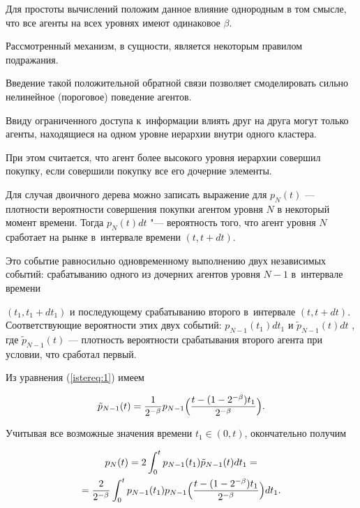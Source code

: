Для простоты вычислений положим данное влияние однородным в том смысле, что все агенты на всех уровнях имеют одинаковое $\beta$.



Рассмотренный механизм, в сущности, является некоторым правилом подражания.

Введение такой положительной обратной связи позволяет смоделировать сильно нелинейное (пороговое) поведение агентов.

Ввиду ограниченного доступа к~информации влиять друг на друга могут только агенты, находящиеся на одном уровне иерархии внутри одного кластера.

При этом считается, что агент более высокого уровня иерархии совершил покупку, если совершили покупку все его дочерние элементы.



Для случая двоичного дерева можно записать выражение для $p_{N} (t)$ --- плотности вероятности совершения покупки агентом уровня $N$ в некоторый момент времени. Тогда $p_{N} (t)dt$ "--- вероятность того, что агент уровня $N$ сработает на рынке в~интервале времени $(t, t+dt)$.

Это событие равносильно одновременному выполнению двух независимых событий: срабатыванию одного из дочерних агентов  уровня $N-1$ в~интервале времени

\mbox{$(t_1, t_1  + dt_1  )$} и последующему срабатыванию второго в~интервале $(t, t+dt)$. Соответствующие вероятности этих двух событий: $p_{N-1} (t_1)dt_1$ и $\tilde{p}_{N-1} (t)dt$ , где $\tilde{p}_{N-1} (t)$ --- плотность вероятности срабатывания второго агента при условии, что сработал первый.

Из уравнения (\ref{istereq:1}) имеем

$$

\tilde{p}_{N-1} (t)=\frac{1}{2^{-\beta } } p_{N-1} \Bigl(\frac{t-(1-2^{-\beta } )t_1  }{2^{-\beta } } \Bigr).

$$

Учитывая все возможные значения времени $t_1  \in (0, t)$, окончательно получим

\begin{multline}

p_{N} (t)=2\int _{0}^{t}p_{N-1} (t_1)\tilde{p}_{N-1} (t)dt_1=

\\ =

\frac{2}{2^{-\beta } } \int _{0}^{t}p_{N-1} (t_1) p_{N-1} \Bigl(\frac{t-(1-2^{-\beta } )t_1  }{2^{-\beta } } \Bigr)dt_1.

\label{istereq:2}

\end{multline}

